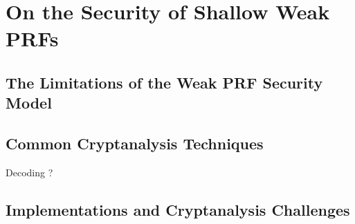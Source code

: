 \section{On the Security of Shallow Weak PRFs}
\label{sec:security}

\subsection{The Limitations of the Weak PRF Security Model}
\label{sec:security-discussion}


\subsection{Common Cryptanalysis Techniques}
\label{sec:security-techniques}

Decoding ?



\subsection{Implementations and Cryptanalysis Challenges}
\label{sec:security-challenges}




